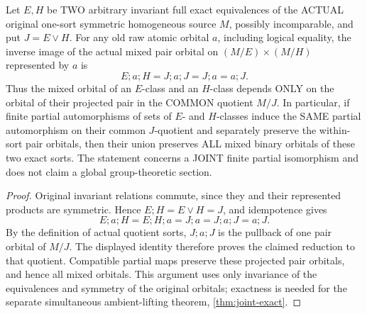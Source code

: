 \begin{lemma}
\label{lem:acf-mixed-exact-join}
Let \(E,H\) be TWO arbitrary invariant full exact
equivalences of the ACTUAL original one-sort
symmetric homogeneous source \(M\), possibly
incomparable, and put \(J=E\vee H\).
For any old raw atomic orbital \(a\), including
logical equality, the inverse image of the
actual mixed pair orbital on
\((M/E)\times(M/H)\) represented by \(a\)
is
\[
 \boxed{\quad
       E;a;H=J;a;J=J;a=a;J.
       \quad}
\tag{MEJ}\label{eq:acf-mixed-exact-join}
\]
Thus the mixed orbital of an \(E\)-class
and an \(H\)-class depends ONLY on the
orbital of their projected pair in the
COMMON quotient \(M/J\). In particular,
if finite partial automorphisms of sets
of \(E\)- and \(H\)-classes induce the
SAME partial automorphism on their
common \(J\)-quotient and separately
preserve the within-sort pair orbitals,
then their union preserves ALL mixed
binary orbitals of these two exact sorts.
The statement concerns a JOINT finite
partial isomorphism and does not claim
a global group-theoretic section.
\end{lemma}
\begin{proof}
Original invariant relations commute, since they and their
represented products are symmetric. Hence $E;H=E\vee H=J$,
and idempotence gives
\[
 E;a;H=E;H;a=J;a=J;a;J=a;J.
\]
By the definition of actual quotient sorts, $J;a;J$ is the
pullback of one pair orbital of $M/J$. The displayed identity
therefore proves the claimed reduction to that quotient.
Compatible partial maps preserve these projected pair orbitals,
and hence all mixed orbitals. This argument uses only invariance
of the equivalences and symmetry of the original orbitals;
exactness is needed for the separate simultaneous ambient-lifting
theorem, \cref{thm:joint-exact}.
\end{proof}


